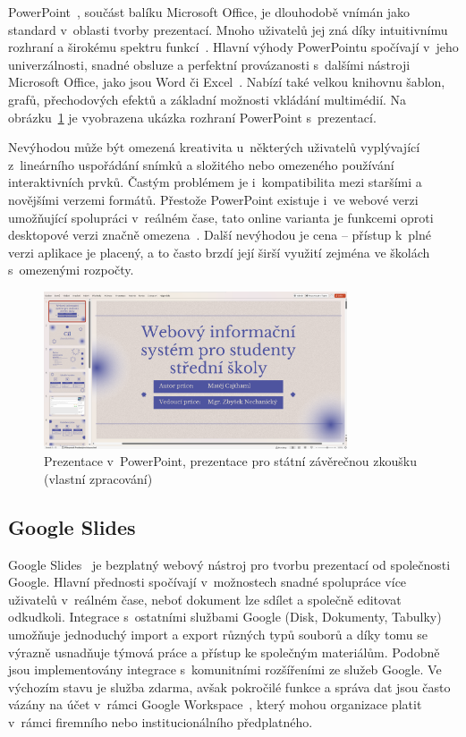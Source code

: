PowerPoint~\cite{pp_usage}, součást balíku Microsoft Office, je dlouhodobě vnímán jako standard v~oblasti tvorby prezentací.
Mnoho uživatelů jej zná díky intuitivnímu rozhraní a širokému spektru funkcí~\cite{pp_usage}.
Hlavní výhody PowerPointu spočívají v~jeho univerzálnosti, snadné obsluze a perfektní provázanosti s~dalšími nástroji Microsoft Office, jako jsou Word či Excel~\cite{pp_excel, pp_word}.
Nabízí také velkou knihovnu šablon, grafů, přechodových efektů a základní možnosti vkládání multimédií.
Na obrázku~\ref{fig:analyza/powerpoint} je vyobrazena ukázka rozhraní PowerPoint s~prezentací. 

Nevýhodou může být omezená kreativita u~některých uživatelů vyplývající z~lineárního uspořádání snímků a složitého nebo omezeného používání interaktivních prvků. 
Častým problémem je i~kompatibilita mezi staršími a novějšími verzemi formátů.
Přestože PowerPoint existuje i~ve webové verzi umožňující spolupráci v~reálném čase, tato online varianta je funkcemi oproti desktopové verzi značně omezena~\cite{pp_platforms}.
Další nevýhodou je cena -- přístup k~plné verzi aplikace je placený, a to často brzdí její širší využití zejména ve školách s~omezenými rozpočty.

\begin{figure}[ht!]
    \centering
    \includegraphics[width=0.8\textwidth]{media/03_analyza/powerpoint.png}
    \caption[Prezentace v~PowerPoint, pro státní závěrečnou zkoušku]{Prezentace v~PowerPoint, prezentace pro státní závěrečnou zkoušku (vlastní zpracování)}
    \label{fig:analyza/powerpoint}
\end{figure}


\subsection{Google Slides}\label{text:google_slides}

Google Slides~\cite{slides} je bezplatný webový nástroj pro tvorbu prezentací od společnosti Google. 
Hlavní přednosti spočívají v~možnostech snadné spolupráce více uživatelů v~reálném čase, neboť dokument lze sdílet a společně editovat odkudkoli.
Integrace s~ostatními službami Google (Disk, Dokumenty, Tabulky) umožňuje jednoduchý import a export různých typů souborů a díky tomu se výrazně usnadňuje týmová práce a přístup ke společným materiálům. 
Podobně jsou implementovány integrace s~komunitními rozšířeními ze služeb Google.
Ve výchozím stavu je služba zdarma, avšak pokročilé funkce a správa dat jsou často vázány na účet v~rámci Google Workspace~\cite{slides}, který mohou organizace platit v~rámci firemního nebo institucionálního předplatného. 

